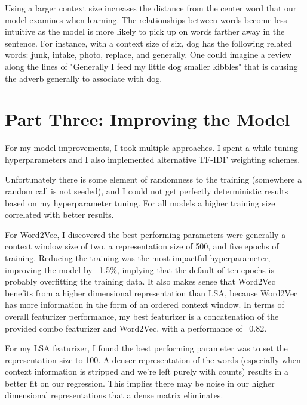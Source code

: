 Using a larger context size increases the distance from the center word that our model examines when learning. The relationships between words become less intuitive as the model is more likely to pick up on words farther away in the sentence. For instance, with a context size of six, dog has the following related words: junk, intake, photo, replace, and generally. One could imagine a review along the lines of "Generally I feed my little dog smaller kibbles" that is causing the adverb generally to associate with dog.







\chapter*{Part Three: Improving the Model}

For my model improvements, I took multiple approaches. I spent a while tuning hyperparameters and I also implemented alternative TF-IDF weighting schemes.

Unfortunately there is some element of randomness to the training (somewhere a random call is not seeded), and I could not get perfectly deterministic results based on my hyperparameter tuning. For all models a higher training size correlated with better results.

For Word2Vec, I discovered the best performing parameters were generally a context window size of two, a representation size of 500, and five epochs of training. Reducing the training was the most impactful hyperparameter, improving the model by ~1.5\%, implying that the default of ten epochs is probably overfitting the training data. It also makes sense that Word2Vec benefits from a higher dimensional representation than LSA, because Word2Vec has more information in the form of an ordered context window. In terms of overall featurizer performance, my best featurizer is a concatenation of the provided combo featurizer and Word2Vec, with a performance of ~0.82.

For my LSA featurizer, I found the best performing parameter was to set the representation size to 100. A denser representation of the words (especially when context information is stripped and we're left purely with counts) results in a better fit on our regression. This implies there may be noise in our higher dimensional representations that a dense matrix eliminates.

